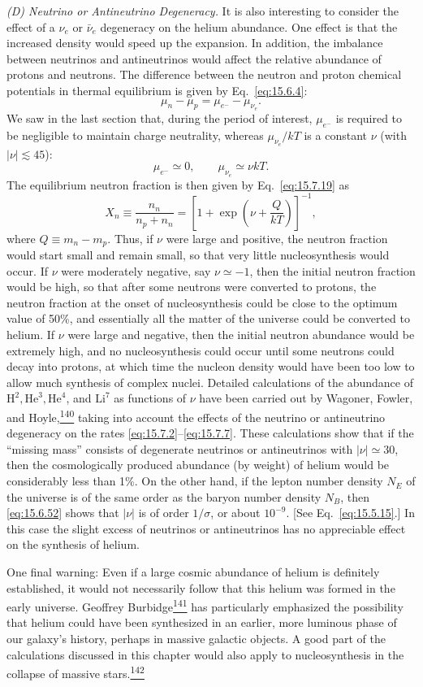 \emph{(D) Neutrino or Antineutrino Degeneracy.} It is also interesting to
consider the effect of a \(\nu_e\) or \(\bar\nu_e\) degeneracy on the helium
abundance. One effect is that the increased density would speed up the
expansion. In addition, the imbalance between neutrinos and antineutrinos
would affect the relative abundance of protons and neutrons. The difference
between the neutron and proton chemical potentials in thermal equilibrium is
given by Eq.~\eqref{eq:15.6.4}:
\[
  \mu_n-\mu_p=\mu_{e^-}-\mu_{\nu_e}.
\]
We saw in the last section that, during the period of interest,
\(\mu_{e^-}\) is required to be negligible to maintain charge neutrality,
whereas \(\mu_{\nu_e}/kT\) is a constant \(\nu\) (with
\(\lvert\nu\rvert\lesssim45\)):
\[
  \mu_{e^-}\simeq0,
  \qquad
  \mu_{\nu_e}\simeq\nu kT.
\]
The equilibrium neutron fraction is then given by
Eq.~\eqref{eq:15.7.19} as
\[
  X_n
  \equiv
  \frac{n_n}{n_p+n_n}
  =
  \left[
    1+\exp\left(\nu+\frac{Q}{kT}\right)
  \right]^{-1},
\]
where \(Q\equiv m_n-m_p\). Thus, if \(\nu\) were large and positive, the
neutron fraction would start small and remain small, so that very little
nucleosynthesis would occur. If \(\nu\) were moderately negative, say
\(\nu\simeq-1\), then the initial neutron fraction would be high, so that
after some neutrons were converted to protons, the neutron fraction at the
onset of nucleosynthesis could be close to the optimum value of 50\%, and
essentially all the matter of the universe could be converted to helium. If
\(\nu\) were large and negative, then the initial neutron abundance would be
extremely high, and no nucleosynthesis could occur until some neutrons could
decay into protons, at which time the nucleon density would have been too low
to allow much synthesis of complex nuclei. Detailed calculations of the
abundance of \(\mathrm H^2,\mathrm{He}^3,\mathrm{He}^4\), and
\(\mathrm{Li}^7\) as functions of \(\nu\) have been carried out by Wagoner,
Fowler, and Hoyle,\hyperref[ch15-ref-140]{\textsuperscript{140}} taking into
account the effects of the neutrino or antineutrino degeneracy on the rates
\eqref{eq:15.7.2}--\eqref{eq:15.7.7}. These calculations show that if the
``missing mass'' consists of degenerate neutrinos or antineutrinos with
\(\lvert\nu\rvert\simeq30\), then the cosmologically produced abundance
(by weight) of helium would be considerably less than 1\%. On the other hand,
if the lepton number density \(N_E\) of the universe is of the same order as
the baryon number density \(N_B\), then \eqref{eq:15.6.52} shows that
\(\lvert\nu\rvert\) is of order \(1/\sigma\), or about \(10^{-9}\). [See
Eq.~\eqref{eq:15.5.15}.] In this case the slight excess of neutrinos or
antineutrinos has no appreciable effect on the synthesis of helium.

One final warning: Even if a large cosmic abundance of helium is definitely
established, it would not necessarily follow that this helium was formed in
the early universe. Geoffrey
Burbidge\hyperref[ch15-ref-141]{\textsuperscript{141}} has particularly
emphasized the possibility that helium could have been synthesized in an
earlier, more luminous phase of our galaxy's history, perhaps in massive
galactic objects. A good part of the calculations discussed in this chapter
would also apply to nucleosynthesis in the collapse of massive
stars.\hyperref[ch15-ref-142]{\textsuperscript{142}}
